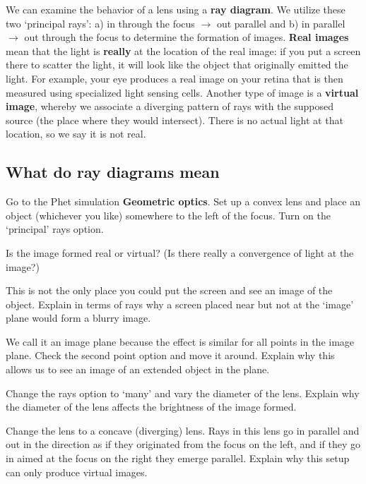 \documentclass{handout}
\begin{document}
We can examine the behavior of a lens using a \textbf{ray diagram}. We utilize these two `principal rays': a) in through the focus $\to$ out parallel and b) in parallel $\to$ out through the focus to determine the formation of images. \textbf{Real images} mean that the light is \textbf{really} at the location of the real image: if you put a screen there to scatter the light, it will look like the object that originally emitted the light. For example, your eye produces a real image on your retina that is then measured using specialized light sensing cells. Another type of image is a \textbf{virtual image}, whereby we associate a diverging pattern of rays with the supposed source (the place where they would intersect). There is no actual light at that location, so we say it is not real.

\clearpage
\subsection{What do ray diagrams mean}
Go to the Phet simulation \textbf{Geometric optics}. Set up a convex lens and place an object (whichever you like) somewhere to the left of the focus. Turn on the `principal' rays option.

\begin{questions}
    \question Is the image formed real or virtual? (Is there really a convergence of light at the image?)

    \answerspace{1.5in}

    \question This is not the only place you could put the screen and see an image of the object. Explain in terms of rays why a screen placed near but not at the `image' plane would form a blurry image.

    \answerspace{1.5in}

    \question We call it an image plane because the effect is similar for all points in the image plane. Check the second point option and move it around. Explain why this allows us to see an image of an extended object in the plane.

    \answerspace{1.5in}

    \question Change the rays option to `many' and vary the diameter of the lens. Explain why the diameter of the lens affects the brightness of the image formed.

    \answerspace{1.5in}
\clearpage
    \question Change the lens to a concave (diverging) lens. Rays in this lens go in parallel and out in the direction as if they originated from the focus on the left, and if they go in aimed at the focus on the right they emerge parallel. Explain why this setup can only produce virtual images.

    \answerspace{1.5in}
\end{questions}
\end{document}
